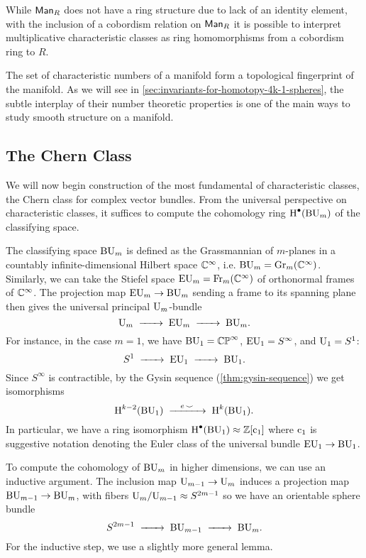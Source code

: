 \begin{remark*}
	While $\mathsf{Man}_R$ does not have a ring structure due to lack of an identity element, with the inclusion of a cobordism relation on $\mathsf{Man}_R$ it is possible to interpret multiplicative characteristic classes as ring homomorphisms from a cobordism ring to $R$.
\end{remark*}

The set of characteristic numbers of a manifold form a topological fingerprint of the manifold. As we will see in \cref{sec:invariants-for-homotopy-4k-1-spheres}, the subtle interplay of their number theoretic properties is one of the main ways to study smooth structure on a manifold.

\subsection{The Chern Class}\label{sec:chern-class}

We will now begin construction of the most fundamental of characteristic classes, the Chern class for complex vector bundles. From the universal perspective on characteristic classes, it suffices to compute the cohomology ring $\operatorname{H}^\bullet(\mathrm{BU}_m)$ of the classifying space. 

The classifying space $\mathrm{BU}_m$ is defined as the Grassmannian of $m$-planes in a countably infinite-dimensional Hilbert space $\mathbb{C}^\infty$, i.e. $\mathrm{BU}_m=\mathrm{Gr}_m(\mathbb{C}^\infty)$. Similarly, we can take the Stiefel space $\mathrm{EU}_m=\operatorname{Fr}_m(\mathbb{C}^\infty)$ of orthonormal frames of $\mathbb{C}^\infty$. The projection map $\mathrm{EU}_m \to \mathrm{BU}_m$ sending a frame to its spanning plane then gives the universal principal $\mathrm{U}_m$-bundle
\[
		\U_m \lkxto \EU_m \lkxto \BU_m.
\]
For instance, in the case $m=1$, we have $\mathrm{BU}_1=\mathbb{CP}^\infty$, $\mathrm{EU}_1=S^\infty$, and $\mathrm{U}_1=S^1$: 
\[
		S^1\lkxto \EU_1 \lkxto \BU_1.
\]
Since $S^\infty$ is contractible, by the Gysin sequence (\cref{thm:gysin-sequence}) we get isomorphisms
\[
	\H^{k-2}(\BU_1)\lkxto[e\,\smile] \H^k(\BU_1).
\]
In particular, we have a ring isomorphism $\operatorname{H}^\bullet(\mathrm{BU}_1)\approx \mathbb{Z}[\mathrm{c}_1]$ where $\mathrm{c}_1$ is suggestive notation denoting the Euler class of the universal bundle $\mathrm{EU}_1 \to \mathrm{BU}_1$. 

To compute the cohomology of $\mathrm{BU}_m$ in higher dimensions, we can use an inductive argument. The inclusion map $\mathrm{U}_{m-1} \to \mathrm{U}_m$ induces a projection map $\mathrm{BU}_{m-1} \to \mathrm{BU}_{m}$, with fibers $\mathrm{U}_{m}/\mathrm{U}_{m-1}\approx S^{2m-1}$ so we have an orientable sphere bundle
\[
	S^{2m-1} \lkxto \BU_{m-1} \lkxto \BU_{m}.
\]
For the inductive step, we use a slightly more general lemma.

